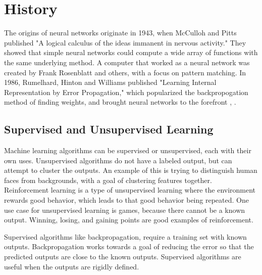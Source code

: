 \documentclass[12pt]{ucthesis}
\begin{document}

\section{History}
\label{History}

The origins of neural networks originate in 1943, when McCulloh and Pitts published "A logical calculus of the ideas immanent in nervous activity." They showed that simple neural networks could compute a wide array of functions with the same underlying method. A computer that worked as a neural network was created by Frank Rosenblatt and others, with a focus on pattern matching. In 1986, Rumelhard, Hinton and Williams published "Learning Internal Representation by Error Propagation," which popularized the backpropogation method of finding weights, and brought neural networks to the forefront \cite{BackpropHist}, \cite{yadav_2015}.

\subsection{Supervised and Unsupervised Learning}
Machine learning algorithms can be supervised or unsupervised, each with their own uses. Unsupervised algorithms do not have a labeled output, but can attempt to cluster the outputs.  An example of this is trying to distinguish human faces from backgrounds, with a goal of clustering features together. Reinforcement learning is a type of unsupervised learning where the environment rewards good behavior, which leads to that good behavior being repeated. One use case for unsupervised learning is games, because there cannot be a known output. Winning, losing, and gaining points are good examples of reinforcement. 

Supervised algorithms like backpropagation, require a training set with known outputs. Backpropagation works towards a goal of reducing the error so that the predicted outputs are close to the known outputs. Supervised algorithms are useful when the outputs are rigidly defined\cite{SuperAndNotSuper}.
\end{document}
